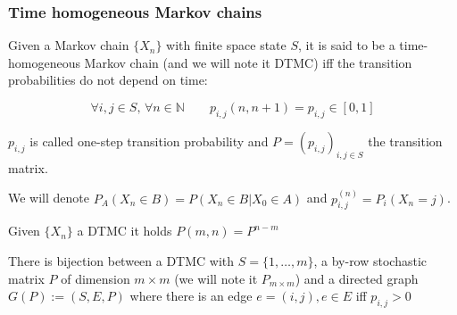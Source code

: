  \begin{frame} \frametitle{Time homogeneous Markov chains}
    \begin{definition}
    Given a Markov chain \(\{X_n\}\) with finite space state \(S\), it is said to be a 
    time-homogeneous Markov chain (and we will note it DTMC) iff the transition 
    probabilities do not depend on time:

    \[
    \forall i, j\in S, \,\forall n \in \mathbb{N} \qquad p_{i, j} (n, n + 1) = p_{i, j} \in [0, 1]
    \]

    \(p_{i, j}\) is called one-step transition probability and \(P = (p_{i, j})_{i, j \in S}\) the transition matrix.
    \end{definition}
    
    \begin{definition}
     We will denote $P_A(X_n \in B) = P(X_n \in B | X_{0} \in A)$ and $p_{i,j}^{(n)} = P_i(X_n = j)$.
    \end{definition}

    \begin{proposition}
    Given \(\{X_n\}\) a DTMC it holds \(P(m, n) = P^{n - m}\)
    \end{proposition}
    
    \begin{remark}
    There is bijection between a DTMC with $S = \{1, \ldots, m\}$,
    a by-row stochastic matrix $P$ of dimension $m \times m$ (we will note it 
    $P_{m\times m}$) and a directed graph $G(P):=(S, E, P)$ where there is an
    edge $e = (i, j), e \in E$ iff $p_{i,j} > 0$
    \end{remark}
 \end{frame}
